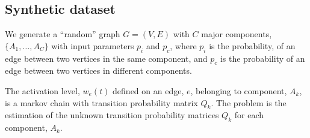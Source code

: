 \documentclass{bioinfo}
\begin{document}
\subsection{Synthetic dataset}
\label{sec:synthetic-dataset}
We generate a ``random'' graph $G=(V, E)$ with $C$ major components,
$\{A_1,\ldots, A_C\}$ with input parameters $p_{i}$ and $p_{c}$,
where $p_{i}$ is the probability, of an edge between two vertices in
the same component,  and $p_c$ is the probability of an edge between
two vertices in different components.  

The activation level, $w_e(t)$ defined on an edge, $e$, belonging to
component, $A_k$, is a markov chain with transition probability matrix
$Q_{k}$. The problem is the estimation of the unknown transition probability
matrices $Q_k$ for each component, $A_k$. 
\end{document}
